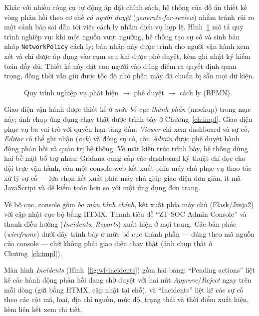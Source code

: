 Khác với nhiều công cụ tự động áp đặt chính sách, hệ thống của đồ án thiết kế vòng phản
hồi theo cơ chế \emph{có người duyệt} (\textit{generate-for-review}) nhằm tránh rủi ro
một cảnh báo sai dẫn tới việc cách ly nhầm dịch vụ hợp lệ. Hình~\ref{fig:bpmn} mô tả quy
trình nghiệp vụ: khi một nguồn vượt ngưỡng, hệ thống tạo sự cố và sinh bản nháp
\texttt{NetworkPolicy} cách ly; bản nháp này được trình cho người vận hành xem xét và
chỉ được áp dụng vào cụm sau khi được phê duyệt, kèm ghi nhật ký kiểm toán đầy đủ. Thiết
kế này đặt con người vào đúng điểm ra quyết định quan trọng, đồng thời vẫn giữ được tốc
độ nhờ phần máy đã chuẩn bị sẵn mọi dữ kiện.

\begin{figure}[H]
  \centering
  \resizebox{0.95\linewidth}{!}{}
  \caption{Quy trình nghiệp vụ phát hiện $\rightarrow$ phê duyệt $\rightarrow$ cách ly (BPMN).}
  \label{fig:bpmn}
\end{figure}

Giao diện vận hành được thiết kế ở \emph{mức bố cục thành phần} (mockup) trong mục này;
ảnh chụp ứng dụng chạy thật được trình bày ở Chương~\ref{ch:impl}. Giao diện phục vụ ba
vai trò với quyền hạn tăng dần: \textit{Viewer} chỉ xem dashboard và sự cố,
\textit{Editor} có thể ghi nhận (\textit{ack}) và đóng sự cố, còn \textit{Admin} được
phê duyệt hành động phản hồi và quản trị hệ thống. Về mặt kiến trúc trình bày, hệ thống
dùng hai bề mặt bổ trợ nhau: Grafana cung cấp các dashboard kỹ thuật chỉ-đọc cho đội
trực vận hành, còn một console web kết xuất phía máy chủ phục vụ thao tác xử lý sự cố ---
lựa chọn kết xuất phía máy chủ giúp giao diện đơn giản, ít mã JavaScript và dễ kiểm
toán hơn so với một ứng dụng đơn trang.

Về bố cục, console gồm \emph{ba màn hình chính}, kết xuất phía máy chủ (Flask/Jinja2)
với cập nhật cục bộ bằng HTMX. Thanh tiêu đề ``ZT-SOC Admin Console'' và thanh điều hướng
(\textit{Incidents}, \textit{Reports}) xuất hiện ở mọi trang. Các bản phác
(\textit{wireframe}) dưới đây trình bày ở mức bố cục thành phần --- đúng theo mã nguồn của
console --- chứ không phải giao diện chạy thật (ảnh chụp thật ở Chương~\ref{ch:impl}).

Màn hình \textit{Incidents} (Hình~\ref{fig:wf-incidents}) gồm hai bảng: ``Pending actions''
liệt kê các hành động phản hồi đang chờ duyệt với hai nút \emph{Approve}/\emph{Reject} ngay
trên mỗi dòng (gửi bằng HTMX, cập nhật tại chỗ), và ``Incidents'' liệt kê các sự cố theo
các cột mã, loại, địa chỉ nguồn, mức độ, trạng thái và thời điểm xuất hiện, kèm liên kết
xem chi tiết.

